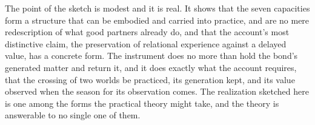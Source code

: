 The point of the sketch is modest and it is real. It shows that the seven capacities form a structure that can be embodied and carried into practice, and are no mere redescription of what good partners already do, and that the account's most distinctive claim, the preservation of relational experience against a delayed value, has a concrete form. The instrument does no more than hold the bond's generated matter and return it, and it does exactly what the account requires, that the crossing of two worlds be practiced, its generation kept, and its value observed when the season for its observation comes. The realization sketched here is one among the forms the practical theory might take, and the theory is answerable to no single one of them.
